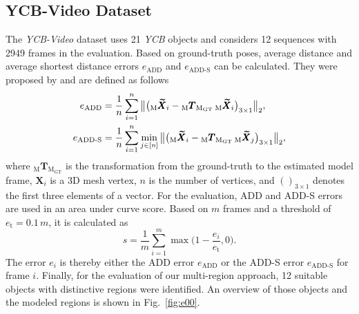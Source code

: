 \documentclass[letterpaper, 10 pt, conference]{ieeeconf}
\begin{document}
\subsection{YCB-Video Dataset}\label{ssec:e0}
The \textit{YCB-Video} dataset \cite{Xiang2018} uses 21 \textit{YCB} objects and considers 12 sequences with 2949 frames in the evaluation.
Based on ground-truth poses, average distance and average shortest distance errors $e_\text{ADD}$ and $e_\text{ADD-S}$ can be calculated.
They were proposed by \cite{Hinterstoisser2013} and are defined as follows
\begin{align}\label{eq:e00}
	e_\text{ADD} &= \frac{1}{n}\sum_{i=1}^n\big\lVert \big({}_\text{M}\pmb{\widetilde{X}}_i -  {}_\text{M}\pmb{T}_{\text{M}_\text{GT}}\,{}_\text{M}\pmb{\widetilde{X}}_i\big)_{3\times 1}\big\rVert_2,\\\label{eq:e01}
	e_\text{ADD\textnormal{-}S} &= \frac{1}{n}\sum_{i=1}^n \min_{j\in[n]} \big\lVert \big({}_\text{M}\pmb{\widetilde{X}}_i -  {}_\text{M}\pmb{T}_{\text{M}_\text{GT}}\,{}_\text{M}\pmb{\widetilde{X}}_j\big)_{3\times 1}\big\rVert_2,
\end{align}
where ${}_\textrm{M}\pmb{T}_{\textrm{M}_{\textrm{GT}}}$ is the transformation from the ground-truth to the estimated model frame, $\pmb{X}_i$ is a 3D mesh vertex, $n$ is the number of vertices, and $()_{3\times 1}$ denotes the first three elements of a vector.
For the evaluation, ADD and ADD-S errors are used in an area under curve score.
Based on $m$ frames and a threshold of $e_\textrm{t} = 0.1\,\unit{m}$, it is calculated as
\begin{equation}\label{eq:e02}
	s = \frac{1}{m}\sum_{i=1}^m \max\Big(1 - \frac{e_{i}}{e_\textrm{t}}, 0\Big).
\end{equation}
The error $e_i$ is thereby either the ADD error $e_{\textrm{ADD}}$ or the ADD-S error $e_{\textrm{ADD-S}}$ for frame $i$.
Finally, for the evaluation of our multi-region approach, 12 suitable objects with distinctive regions were identified.
An overview of those objects and the modeled regions is shown in Fig.~\ref{fig:e00}.
\end{document}
